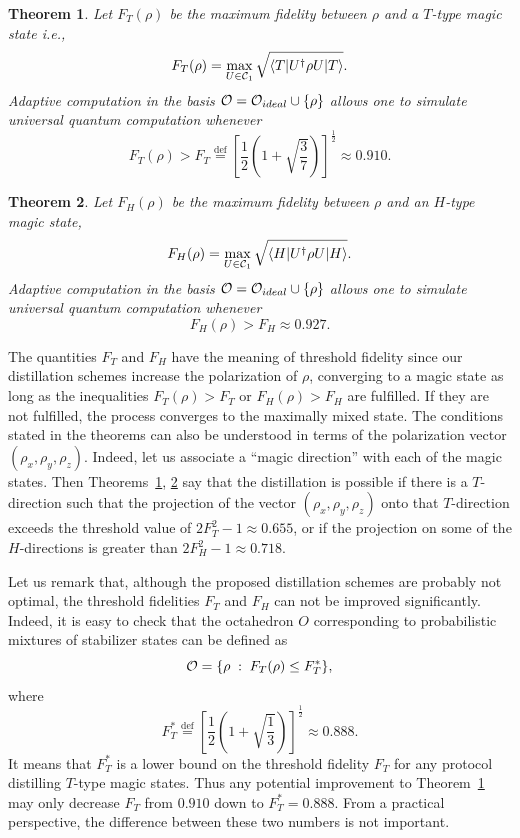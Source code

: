 \documentclass[pra,twocolumn,showpacs]{revtex4}
\newtheorem{theorem}{Theorem}
\newcommand{\calO}{{\cal O }}
\newcommand{\la}{\langle}
\newcommand{\ra}{\rangle}
\newcommand*{\Cl}[1]{{\cal C}_{#1}}
\newcommand{\bydef}{\stackrel{\mathrm{def}}{=}}
\newcommand{\Tt}{$T$}
\newcommand{\Hh}{$H$}
\begin{document}
\begin{theorem}
\label{T-theorem}
Let $F_T(\rho)$ be the maximum fidelity between $\rho$ and a \Tt-type magic
state i.e.,
\[
F_T(\rho)=\max_{U\in \Cl{1}} \sqrt{\la T|U^\dag \rho U |T\ra}.
\]
Adaptive computation in the basis $\calO=\calO_{ideal}\cup\{\rho\}$ allows one
to simulate universal quantum computation whenever
\[
F_T(\rho)>F_T\bydef \left[\frac12\left( 1+\sqrt{\frac37}\right)\right]^\frac12
 \approx 0.910.
\]
\end{theorem}

\begin{theorem}
\label{H-theorem}
Let $F_H(\rho)$ be the maximum fidelity between $\rho$ and an \Hh-type magic
state,
\[
F_H(\rho)=\max_{U\in \Cl{1}} \sqrt{\la H|U^\dag \rho U |H\ra}.
\]
Adaptive computation in the basis $\calO=\calO_{ideal}\cup\{\rho\}$ allows one
to simulate universal quantum computation whenever
\[
F_H(\rho)>F_H\approx 0.927.
\]
\end{theorem}

The quantities $F_T$ and $F_H$ have the meaning of threshold fidelity since
our distillation schemes increase the polarization of $\rho$, converging to a
magic state as long as the inequalities $F_T(\rho)>F_T$ or $F_H(\rho)>F_H$ are
fulfilled. If they are not fulfilled, the process converges to the maximally
mixed state. The conditions stated in the theorems can also be understood in
terms of the polarization vector $(\rho_x,\rho_y,\rho_z)$.  Indeed, let us
associate a ``magic direction'' with each of the magic states. Then
Theorems~\ref{T-theorem}, \ref{H-theorem} say that the distillation is
possible if there is a \Tt-direction such that the projection of the vector
$(\rho_x,\rho_y,\rho_z)$ onto that \Tt-direction exceeds 
the threshold value of $2F_{T}^{2}-1\approx 0.655$,
or if the projection on some of the $H$-directions is greater than
$2F_{H}^{2}-1\approx 0.718$.

Let us remark that, although the proposed distillation schemes are probably
not optimal, the threshold fidelities $F_T$ and $F_H$ can not be improved
significantly. Indeed, it is easy to check that the octahedron $O$
corresponding to probabilistic mixtures of stabilizer states can be defined as
\[
\calO = \{ \rho \; : \;  F_T(\rho)\le F_T^*\},
\]
where 
\[
F_T^* \bydef \left[\frac12\left( 1+\sqrt{\frac13}\right)\right]^\frac12
\approx 0.888.
\]
It means that $F_T^*$ is a lower bound on the threshold fidelity $F_T$ for any
protocol distilling \Tt-type magic states. Thus any potential improvement to
Theorem~\ref{T-theorem} may only decrease $F_T$ from $0.910$ down to
$F_T^*=0.888$. From a practical perspective, the difference between these two
numbers is not important.
\end{document}
